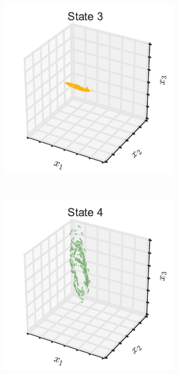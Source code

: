 \documentclass{article}
\begin{document}
\begin{figure}[th!]
\begin{subfigure}[b]{0.32\linewidth}
  \end{subfigure}
  \begin{subfigure}[b]{0.32\linewidth}
    \includegraphics[width=\textwidth]{dynamics_3d_2.pdf}
  \end{subfigure}
  \\
  \begin{subfigure}[b]{0.32\linewidth}
    \includegraphics[width=\textwidth]{dynamics_3d_3.pdf}

\end{subfigure}
\end{figure}
\end{document}
